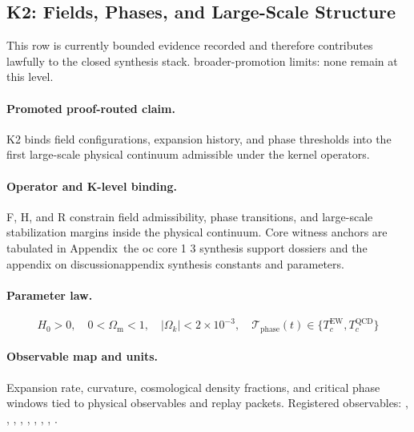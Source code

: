 \subsection{K2: Fields, Phases, and Large-Scale Structure}
\label{sec:oc-core-1-3-synthesis-k2}
This row is currently bounded evidence recorded and therefore contributes lawfully to the closed synthesis stack.
broader-promotion limits: none remain at this level.

\paragraph{Promoted proof-routed claim.}
K2 binds field configurations, expansion history, and phase thresholds into the first large-scale physical continuum admissible under the kernel operators.

\paragraph{Operator and K-level binding.}
F, H, and R constrain field admissibility, phase transitions, and large-scale stabilization margins inside the physical continuum.
Core witness anchors are tabulated in Appendix~the oc core 1 3 synthesis support dossiers and the appendix on discussionappendix synthesis constants and parameters.

\paragraph{Parameter law.}
\[
H_0 > 0,\quad 0 < \Omega_{\mathrm{m}} < 1,\quad |\Omega_k| < 2 \times 10^{-3},\quad \mathcal{T}_{\mathrm{phase}}(t) \in \{T_c^{\mathrm{EW}}, T_c^{\mathrm{QCD}}\}
\]

\paragraph{Observable map and units.}
Expansion rate, curvature, cosmological density fractions, and critical phase windows tied to physical observables and replay packets.
Registered observables: , \allowbreak {}, \allowbreak {}, \allowbreak {}, \allowbreak {}, \allowbreak {}, \allowbreak {}, \allowbreak {}, \allowbreak {}.

